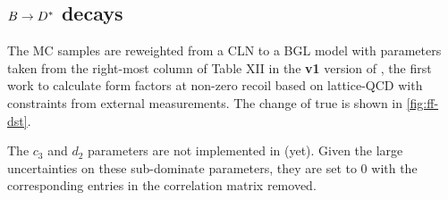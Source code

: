 \subsection{$B \rightarrow {\ensuremath{{D}^*}}$ decays}
The \Dstar MC samples are reweighted from a CLN to a BGL model with parameters
taken from the right-most column of Table XII in the \textbf{v1} version of
\cite{Bazavov_2021},
the first work to calculate \Dstar form factors at non-zero recoil
based on lattice-QCD with constraints from external measurements.
The change of true \qSq is shown in \cref{fig:ff-dst}.

The $c_3$ and $d_2$ parameters are not implemented in \Hammer (yet).
Given the large uncertainties on these sub-dominate parameters,
they are set to 0 with the corresponding entries in the correlation matrix
removed.

